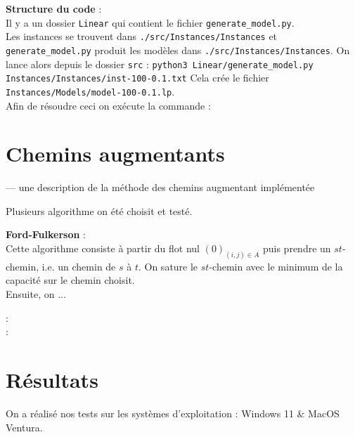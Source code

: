 \documentclass{article}[12pt]
\begin{document}
{\bf Structure du code } : \\
Il y a un dossier \texttt{Linear} qui contient le fichier \texttt{generate\_model.py}. \\
Les instances se trouvent dans \texttt{./src/Instances/Instances} et \texttt{generate\_model.py} produit les modèles dans \texttt{./src/Instances/Instances}.
On lance alors depuis le dossier \texttt{src} : 
\texttt{python3 Linear/generate\_model.py Instances/Instances/inst-100-0.1.txt}
Cela crée le fichier \texttt{Instances/Models/model-100-0.1.lp}.\\
 Afin de résoudre ceci on exécute la commande : \\


\section{Chemins augmentants}

— une description de la méthode des chemins augmentant implémentée

Plusieurs algorithme on été choisit et testé.

{\bf Ford-Fulkerson} : \\

Cette algorithme consiste à partir du flot nul $(0)_{(i,j) \in A}$ puis prendre un $st$-chemin, i.e. un chemin de $s$ à $t$.
On sature le $st$-chemin avec le minimum de la capacité sur le chemin choisit.\\
Ensuite, on ... %

{\bf } : \\

{\bf } : \\

\section{Résultats}
    
 On a réalisé nos tests sur les systèmes d’exploitation : Windows 11 \& MacOS Ventura.\\
\end{document}
